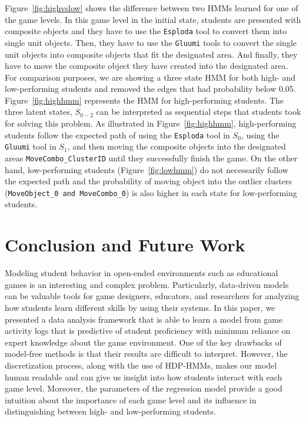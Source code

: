 \documentclass{sigchi}
\begin{document}
Figure~\ref{fig:highvslow} shows the difference between two HMMs learned for one of the game levels.
In this game level in the initial state, students are presented with composite objects and they have to use the \texttt{Esploda} tool to convert them into single unit objects. 
Then, they have to use the \texttt{Gluumi} tools to convert the single unit objects into composite objects that fit the designated area. 
And finally, they have to move the composite object they have created into the designated area.
For comparison purposes, we are showing a three state HMM for both high- and low-performing students and removed the edges that had probability below 0.05. 
Figure~\ref{fig:highhmm} represents the HMM for high-performing students. 
The three latent states, $S_{0-2}$ can be interpreted as sequential steps that students took for solving this problem. As illustrated in Figure~\ref{fig:highhmm}, high-performing students follow the expected path of using the \texttt{Esploda} tool in $S_0$, using the \texttt{Gluumi} tool in $S_1$, and then moving the composite objects into the designated areas \texttt{MoveCombo\_{ClusterID}} until they successfully finish the game.
On the other hand, low-performing students (Figure~\ref{fig:lowhmm}) do not necessarily follow the expected path and the probability of moving object into the outlier clusters (\texttt{MoveObject\_0 and MoveCombo\_0}) is also higher in each state for low-performing students.

\section{Conclusion and Future Work}
Modeling student behavior in open-ended environments such as educational games is an interesting and complex problem. 
Particularly, data-driven models can be valuable tools for game designers, educators, and researchers for analyzing how students learn different skills by using their systems.
In this paper, we presented a data analysis framework that is able to learn a model from game activity logs that is predictive of student proficiency with minimum reliance on expert knowledge about the game environment. 
One of the key drawbacks of model-free methods is that their results are difficult to interpret. 
However, the discretization process, along with the use of HDP-HMMs, makes our model human readable and can give us insight into how students interact with each game level.
Moreover, the parameters of the regression model provide a good intuition about the importance of each game level and its influence in distinguishing between high- and low-performing students.
\end{document}
